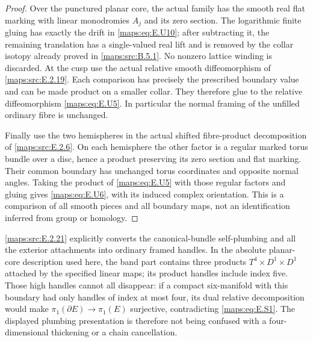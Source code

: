 \begin{proof}
Over the punctured planar core, the actual family has the
smooth real flat marking with linear monodromies $A_j$ and
its zero section.  The logarithmic finite gluing has exactly
the drift in \eqref{maps:eq:E.U10}; after subtracting it, the remaining
translation has a single-valued real lift and is removed by
the collar isotopy already proved in \ref{maps:src:B.5.1}.  No nonzero
lattice winding is discarded.  At the cusp use the actual
relative smooth diffeomorphism of \ref{maps:src:E.2.19}.  Each comparison
has precisely the prescribed boundary value and can be
made product on a smaller collar.  They therefore glue to
the relative diffeomorphism \eqref{maps:eq:E.U5}.  In particular the
normal framing of the unfilled ordinary fibre is unchanged.

Finally use the two hemispheres in the actual shifted
fibre-product decomposition of \ref{maps:src:E.2.6}.  On each hemisphere
the other factor is a regular marked torus bundle over a
disc, hence a product preserving its zero section and flat
marking.  Their common boundary has unchanged torus
coordinates and opposite normal angles.  Taking the product
of \eqref{maps:eq:E.U5} with those regular factors and gluing gives
\eqref{maps:eq:E.U6}, with its induced complex orientation.  This is a
comparison of all smooth pieces and all boundary maps,
not an identification inferred from group or homology.
\end{proof}

\ref{maps:src:E.2.21} explicitly converts the canonical-bundle self-plumbing and
all the exterior attachments into ordinary framed handles.
In the absolute planar-core description used here, the band part
contains three products
$T^4\times D^1\times D^1$ attached by the specified linear maps;
its product handles include index five.  Those high handles
cannot all disappear: if a compact six-manifold with this boundary
had only handles of index at most four, its dual relative
decomposition would make $\pi_1(\partial E)\to\pi_1(E)$ surjective,
contradicting \eqref{maps:eq:E.S1}.  The displayed plumbing presentation is
therefore not being confused with a four-dimensional thickening
or a chain cancellation.



